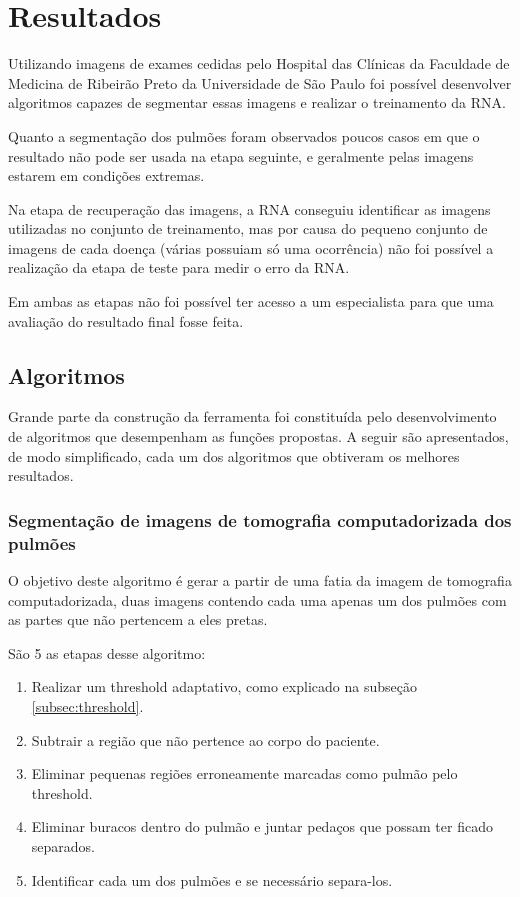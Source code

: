 \chapter{Resultados}

Utilizando imagens de exames cedidas pelo Hospital das Clínicas da Faculdade de Medicina de Ribeirão Preto da Universidade de São Paulo foi possível desenvolver algoritmos capazes de segmentar essas imagens e realizar o treinamento da RNA.

Quanto a segmentação dos pulmões foram observados poucos casos em que o resultado não pode ser usada na etapa seguinte, e geralmente pelas imagens estarem em condições extremas.

Na etapa de recuperação das imagens, a RNA conseguiu identificar as imagens utilizadas no conjunto de treinamento, mas por causa do pequeno conjunto de imagens de cada doença (várias possuiam só uma ocorrência) não foi possível a realização da etapa de teste para medir o erro da RNA.

Em ambas as etapas não foi possível ter acesso a um especialista para que uma avaliação do resultado final fosse feita.

\section{Algoritmos}

Grande parte da construção da ferramenta foi constituída pelo desenvolvimento de algoritmos que desempenham as funções propostas. A seguir são apresentados, de modo simplificado, cada um dos algoritmos que obtiveram os melhores resultados.

\subsection{Segmentação de imagens de tomografia computadorizada dos pulmões}

O objetivo deste algoritmo é gerar a partir de uma fatia da imagem de tomografia computadorizada, duas imagens contendo cada uma apenas um dos pulmões com as partes que não pertencem a eles pretas.

São 5 as etapas desse algoritmo:
\begin{enumerate}
 \item Realizar um threshold adaptativo, como explicado na subseção \ref{subsec:threshold}.
 \item Subtrair a região que não pertence ao corpo do paciente.
 \item Eliminar pequenas regiões erroneamente marcadas como pulmão pelo threshold.
 \item Eliminar buracos dentro do pulmão e juntar pedaços que possam ter ficado separados.
 \item Identificar cada um dos pulmões e se necessário separa-los.
\end{enumerate}

